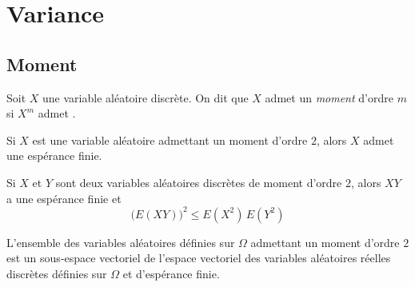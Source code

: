 \documentclass[11pt,a4paper,fleqn,pdftex]{report}
\begin{document}
\section{Variance} %
\label{sec:variance}
\subsection{Moment} %
\label{sub:variance_moment}
\needspace{5cm}
\begin{dfn}
     Soit $X$ une variable aléatoire discrète. On dit que $X$ admet un \emph{moment} d'ordre $m$ si $X^m$ admet .
\end{dfn}
\begin{theorem}
     Si $X$ est une variable aléatoire admettant un moment d'ordre $2$, alors $X$ admet une espérance finie.
\end{theorem}
\begin{theorem}
     Si $X$ et $Y$ sont deux variables aléatoires discrètes de moment d'ordre $2$, alors $XY$ a une espérance finie et
     \begin{equation}
     \bigg( E(XY)\bigg)^2 \le E(X^2)\,E(Y^2)
     \end{equation}
\end{theorem}
\begin{theorem}
     L'ensemble des variables aléatoires définies sur $\Omega$ admettant un moment d'ordre $2$ est un sous-espace vectoriel de l'espace vectoriel des variables aléatoires réelles discrètes définies sur $\Omega$ et d'espérance finie.
\end{theorem}
\end{document}
